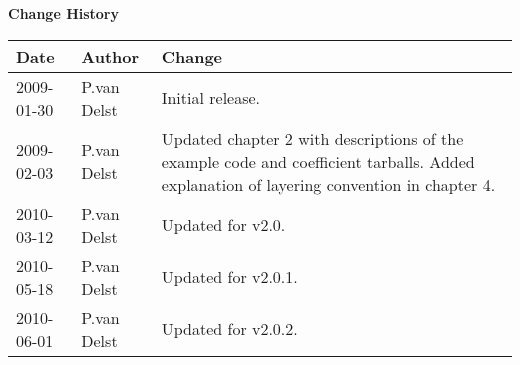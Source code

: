 
\thispagestyle{empty}
\vspace*{10cm}
\begin{center}
  {\sffamily\Large\bfseries Change History}
  \begin{table}[htp]
    \centering
    \begin{tabular}{|p{2cm}|p{3cm}|p{8cm}|}
      \hline
      \sffamily\textbf{Date} & \sffamily\textbf{Author} & \sffamily\textbf{Change}\\
      \hline\hline
      2009-01-30 & P.van Delst & Initial release.\\
      \hline
      2009-02-03 & P.van Delst & Updated chapter 2 with descriptions of the example code and coefficient tarballs. Added explanation of layering convention in chapter 4.\\
      \hline
      2010-03-12 & P.van Delst & Updated for v2.0.\\
      \hline
      2010-05-18 & P.van Delst & Updated for v2.0.1.\\
      \hline
      2010-06-01 & P.van Delst & Updated for v2.0.2.\\
      \hline
    \end{tabular}
  \end{table}
\end{center}
\clearpage

\setcounter{page}{1}
  \tableofcontents\newpage
  \listoffigures\newpage
  \listoftables\newpage
  
  
  
\setcounter{page}{1}









\clearpage
{}
{}




\begin{appendix}
  
  
  
%  
\end{appendix}



